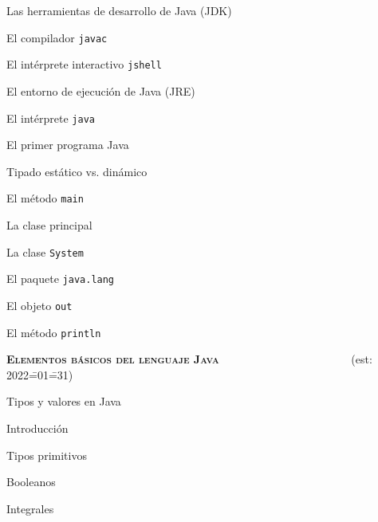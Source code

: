 \begin{longenum}
\begin{longenum}
\begin{longenum}
            \item Las herramientas de desarrollo de Java (JDK)
            \begin{longenum}
                \item El compilador \texttt{javac}
                \item El intérprete interactivo \texttt{jshell}
            \end{longenum}
            \item El entorno de ejecución de Java (JRE)
            \begin{longenum}
                \item El intérprete \texttt{java}
            \end{longenum}
        \end{longenum}
        \item El primer programa Java
        \begin{longenum}
            \item Tipado estático vs. dinámico
            \item El método \texttt{main}
            \item La clase principal
            \item La clase \texttt{System}
            \item El paquete \texttt{java.lang}
            \item El objeto \texttt{out}
            \item El método \texttt{println}
        \end{longenum}
    \end{longenum}
    \item \textbf{\textsc{Elementos básicos del lenguaje Java}} \ \ \ \ \ \ \ \ \ \ \ \ \ \ \ \ \ \ \ \ \ \ \ (est: 2022\==01\==31)
    \begin{longenum}
        \item Tipos y valores en Java
        \begin{longenum}
            \item Introducción
            \item Tipos primitivos
            \begin{longenum}
                \item Booleanos
                \item Integrales
                \begin{longenum}

\end{longenum}
\end{longenum}
\end{longenum}
\end{longenum}
\end{longenum}
